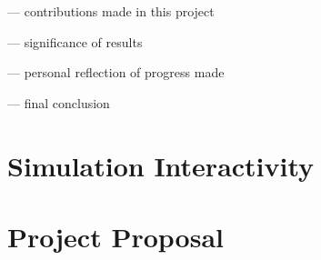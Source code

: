 \documentclass[12pt,a4paper,twoside,openright]{report}
\begin{document}
--- contributions made in this project

--- significance of results

--- personal reflection of progress made

--- final conclusion




\appendix

\chapter{Simulation Interactivity}\label{chapter:simulation-interactivity}

\chapter{Project Proposal}


\end{document}
